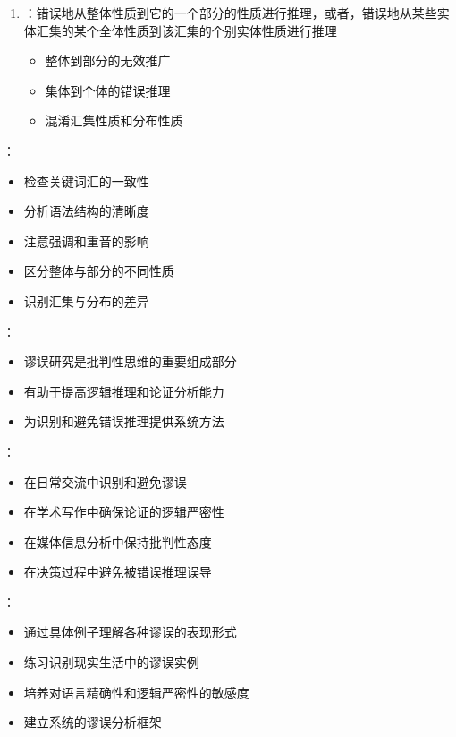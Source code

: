 \begin{theorembox}[title=含混谬误的特征与类型]
\begin{enumerate}
  \item {}：错误地从整体性质到它的一个部分的性质进行推理，或者，错误地从某些实体汇集的某个全体性质到该汇集的个别实体性质进行推理
  \begin{itemize}
    \item 整体到部分的无效推广
    \item 集体到个体的错误推理
    \item 混淆汇集性质和分布性质
  \end{itemize}
\end{enumerate}

：
\begin{itemize}
  \item 检查关键词汇的一致性
  \item 分析语法结构的清晰度
  \item 注意强调和重音的影响
  \item 区分整体与部分的不同性质
  \item 识别汇集与分布的差异
\end{itemize}
\end{theorembox}

\begin{examplebox}[title=第四章学习要点总结]
：
\begin{itemize}
  \item 谬误研究是批判性思维的重要组成部分
  \item 有助于提高逻辑推理和论证分析能力
  \item 为识别和避免错误推理提供系统方法
\end{itemize}

：
\begin{itemize}
  \item 在日常交流中识别和避免谬误
  \item 在学术写作中确保论证的逻辑严密性
  \item 在媒体信息分析中保持批判性态度
  \item 在决策过程中避免被错误推理误导
\end{itemize}

：
\begin{itemize}
  \item 通过具体例子理解各种谬误的表现形式
  \item 练习识别现实生活中的谬误实例
  \item 培养对语言精确性和逻辑严密性的敏感度
  \item 建立系统的谬误分析框架
\end{itemize}
\end{examplebox}

\begin{center}
\end{center}

